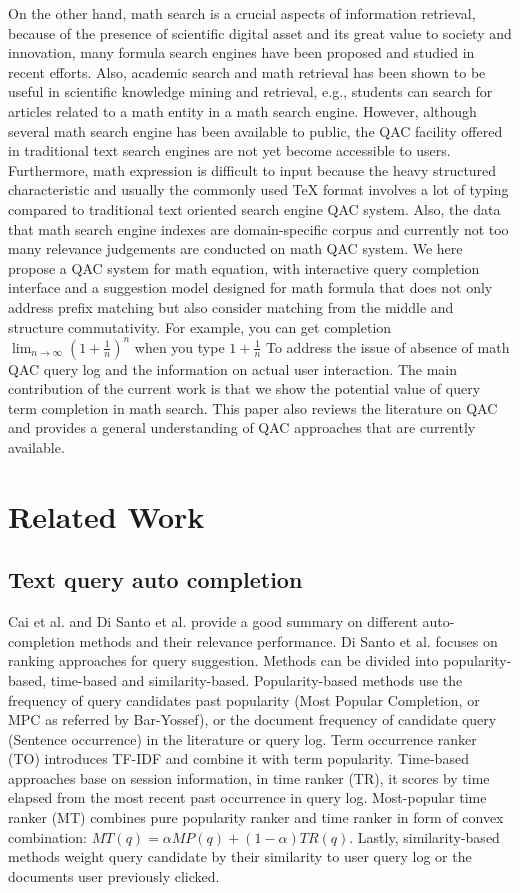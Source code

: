 \documentclass[12pt]{article} %
\begin{document}
On the other hand, math search is a crucial aspects of information retrieval, because of the presence of scientific digital asset and its great value to society and innovation, many formula search engines have been proposed and studied in recent efforts.
Also, academic search and math retrieval has been shown to be useful in scientific knowledge mining and retrieval, e.g., students can search for articles related to a math entity in a math search engine.
However, although several math search engine has been available to public, the QAC facility offered in traditional text search engines are not yet become accessible to users.
Furthermore, math expression is difficult to input because the heavy structured characteristic and 
usually the commonly used TeX format involves a lot of typing compared to traditional text oriented search engine QAC system.
Also, the data that math search engine indexes are domain-specific corpus and currently not too many relevance judgements are conducted on math QAC system.
We here propose a QAC system for math equation,
with interactive query completion interface and a suggestion model designed for math formula that does not only address prefix matching but also consider matching from the middle and structure commutativity.
For example, you can get completion $\lim_{n \to \infty}(1+\frac 1 n)^n$ when you type $1+\frac 1 n$
To address the issue of absence of math QAC query log and the information on actual user interaction.
The main contribution of the current work is that we show the potential value of query
term completion in math search.
This paper also reviews the literature on QAC and provides a general understanding of QAC approaches that are currently available.

\section{Related Work}
\subsection{Text query auto completion}
Cai et al. \cite{cai_survey_2016} and Di Santo et al.  \cite{di_santo_comparing_2015}
provide a good summary on different auto-completion methods and their relevance
performance.
Di Santo et al. \cite{di_santo_comparing_2015} focuses on ranking approaches for query suggestion.
Methods can be divided into popularity-based, time-based and similarity-based.
Popularity-based methods use the frequency of query candidates past popularity (Most Popular Completion, or MPC as referred by Bar-Yossef), or the document frequency of candidate query (Sentence occurrence) in the literature or
query log. Term occurrence ranker (TO) introduces TF-IDF and combine it with term popularity.
Time-based approaches base on session information, in time ranker (TR), it scores by time elapsed from the most recent past occurrence in query log.
Most-popular time ranker (MT) combines pure popularity ranker and time ranker in form of convex combination: $MT(q) = 
\alpha MP(q) + (1-\alpha) TR(q)$.
Lastly, similarity-based methods weight query candidate by their similarity to user query log or the documents user previously clicked.
\end{document}
